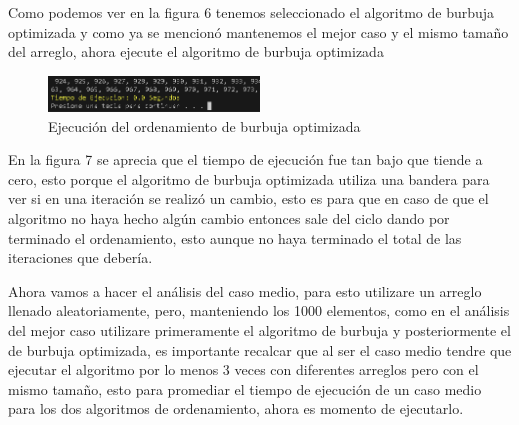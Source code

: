 \documentclass[journal]{IEEEtran}
\begin{document}
  Como podemos ver en la figura 6 tenemos seleccionado
   el algoritmo de burbuja optimizada y como ya se 
   mencionó mantenemos el mejor caso y el mismo tamaño
   del arreglo, ahora ejecute el algoritmo de burbuja optimizada
   \begin{figure}[H]
    \centering
    \begin{adjustbox}{clip=false}
      \includegraphics[width=0.5\textwidth]{7.PNG}
    \end{adjustbox}
    \caption{Ejecución del ordenamiento de burbuja optimizada}
  \end{figure}
  En la figura 7 se aprecia que el tiempo de ejecución 
  fue tan bajo que tiende a cero, esto porque el 
  algoritmo de burbuja optimizada utiliza una bandera 
  para ver si en una iteración se realizó un cambio, 
  esto es para que en caso de que el algoritmo no haya 
  hecho algún cambio entonces sale del ciclo dando por 
  terminado el ordenamiento, esto aunque no haya terminado 
  el total de las iteraciones que debería.


  Ahora vamos a hacer el análisis del caso medio, 
  para esto utilizare un arreglo llenado aleatoriamente, 
  pero, manteniendo los 1000 elementos, como en el análisis 
  del mejor caso utilizare primeramente el algoritmo de 
  burbuja y posteriormente el de burbuja optimizada, es 
  importante recalcar que al ser el caso medio tendre que 
  ejecutar el algoritmo por lo menos 3 veces con diferentes 
  arreglos pero con el mismo tamaño, esto para promediar el 
  tiempo de ejecución de un caso medio para los dos algoritmos 
  de ordenamiento, ahora es momento de ejecutarlo.
\end{document}
